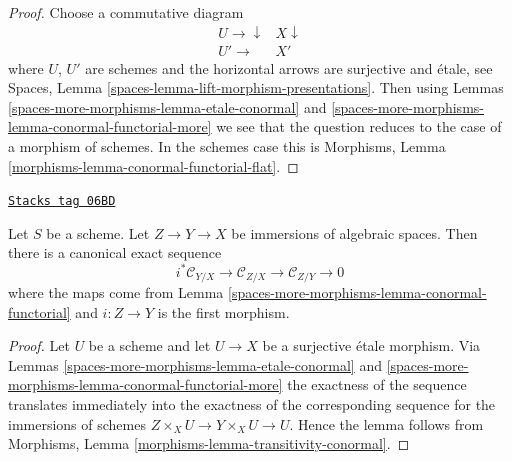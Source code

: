 \begin{proof}
Choose a commutative diagram
$$
\begin{array}{cc}U \longrightarrow\downarrow & X \downarrow \\ U' \longrightarrow & X'\end{array}
$$
where $U$, $U'$ are schemes and the horizontal arrows are surjective
and \'etale, see
Spaces, Lemma \ref{spaces-lemma-lift-morphism-presentations}.
Then using
Lemmas \ref{spaces-more-morphisms-lemma-etale-conormal} and \ref{spaces-more-morphisms-lemma-conormal-functorial-more}
we see that the question reduces to the case of a morphism of schemes.
In the schemes case this is
Morphisms, Lemma \ref{morphisms-lemma-conormal-functorial-flat}.
\end{proof}

\begin{lemma}
\label{spaces-more-morphisms-lemma-transitivity-conormal}
\href{https://stacks.math.columbia.edu/tag/06BD}{\texttt{Stacks tag 06BD}}

Let $S$ be a scheme.
Let $Z \to Y \to X$ be immersions of algebraic spaces.
Then there is a canonical exact sequence
$$
i^*\mathcal{C}_{Y/X} \to
\mathcal{C}_{Z/X} \to
\mathcal{C}_{Z/Y} \to 0
$$
where the maps come from
Lemma \ref{spaces-more-morphisms-lemma-conormal-functorial}
and $i : Z \to Y$ is the first morphism.
\end{lemma}

\begin{proof}
Let $U$ be a scheme and let $U \to X$ be a surjective \'etale morphism. Via
Lemmas \ref{spaces-more-morphisms-lemma-etale-conormal} and \ref{spaces-more-morphisms-lemma-conormal-functorial-more}
the exactness of the sequence translates immediately into the
exactness of the corresponding sequence for the immersions of schemes
$Z \times_X U \to Y \times_X U \to U$. Hence the lemma follows from
Morphisms, Lemma \ref{morphisms-lemma-transitivity-conormal}.
\end{proof}

